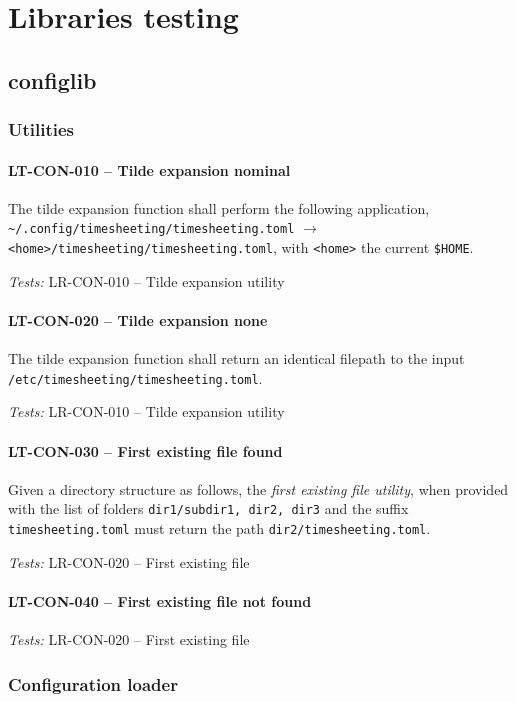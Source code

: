 \section{Libraries testing}
\subsection{config\textunderscore lib}
\subsubsection{Utilities}
\paragraph{LT-CON-010 -- Tilde expansion nominal}
The tilde expansion function shall perform the following application,
\lstinline{~/.config/timesheeting/timesheeting.toml}
$\rightarrow$ \lstinline{<home>/timesheeting/timesheeting.toml},
with \lstinline{<home>} the current \lstinline{$HOME}.

\textit{Tests: } LR-CON-010 -- Tilde expansion utility

\paragraph{LT-CON-020 -- Tilde expansion none}
The tilde expansion function shall return an identical filepath to the
input \lstinline{/etc/timesheeting/timesheeting.toml}.

\textit{Tests: } LR-CON-010 -- Tilde expansion utility

\paragraph{LT-CON-030 -- First existing file found}
Given a directory structure as follows,
the \emph{first existing file utility}, when provided with the list of folders
\lstinline{dir1/subdir1, dir2, dir3} and the suffix
\lstinline{timesheeting.toml}
must return the path \lstinline{dir2/timesheeting.toml}.

\textit{Tests: } LR-CON-020 -- First existing file

\paragraph{LT-CON-040 -- First existing file not found}

\textit{Tests: } LR-CON-020 -- First existing file

\subsubsection{Configuration loader}
